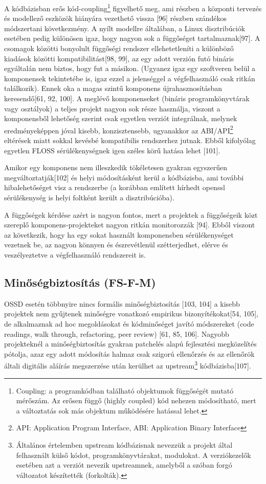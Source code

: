 \documentclass[12pt,magyar,a4paper,oneside]{scrreprt}
\begin{document}
A kódbázisban erős kód-coupling\footnote{Coupling: a programkódban
  található objektumok függőségét mutató mérőszám. Az erősen függő
  (highly coupled) kód nehezen módosítható, mert a változtatás sok más
  objektum működésére hatással lehet.} figyelhető meg, ami részben a
központi tervezés és modellező eszközök hiányára vezethető vissza
{[}96{]} részben szándékos módszertani következmény. A nyílt modellre
általában, a Linux disztribúciók esetében pedig különösen igaz, hogy
nagyon sok a függőséget tartalmaznak{[}97{]}. A csomagok közötti
bonyolult függőségi rendszer ellehetetleníti a különböző kiadások
közötti kompatibilitást{[}98, 99{]}, az egy adott verzión futó bináris
egyáltalán nem biztos, hogy fut a másikon. (Ugyanez igaz egy szoftveren
belül a komponensek tekintetébe is, igaz ezzel a jelenséggel a
végfelhasználó csak ritkán találkozik). Ennek oka a magas szintű
komponens újrahasznosításban keresendő{[}61, 92, 100{]}. A meglévő
komponenseket (bináris programkönyvtárak vagy osztályok) a teljes
projekt nagyon sok része használja, viszont a komponensből lehetőség
szerint csak egyetlen verziót integrálnak, melynek eredményeképpen jóval
kisebb, konzisztensebb, ugyanakkor az ABI/API\footnote{API: Application
  Program Interface, ABI: Application Binary Interface} eltérések miatt
sokkal kevésbé kompatibilis rendszerhez jutnak. Ebből kifolyólag
egyetlen FLOSS sérülékenységnek igen széles körű hatása lehet {[}101{]}.

Amikor egy komponens nem illeszkedik tökéletesen gyakran egyszerűen
megváltoztatják{[}102{]} és helyi módosításként kerül a kódbázisba, ami
további hibalehetőséget visz a rendszerbe (a korábban említett hírhedt
openssl sérülékenység is helyi foltként került a disztribúcióba).

A függőségek kérdése azért is nagyon fontos, mert a projektek a
függőségeik közt szereplő komponens-projekteket nagyon ritkán
monitorozzák {[}94{]}. Ebből viszont az következik, hogy ha egy sokat
használt komponensben sérülékenységet vezetnek be, az nagyon könnyen és
észrevétlenül szétterjedhet, elérve és veszélyeztetve a végfelhasználó
rendszereit is.

\hypertarget{sec:FS-F-M}{%
\subsection{Minőségbiztosítás (FS-F-M)}\label{sec:FS-F-M}}

OSSD esetén többnyire nincs formális minőségbiztosítás {[}103, 104{]} a
kisebb projektek nem gyűjtenek minőségre vonatkozó empirikus
bizonyítékokat{[}54, 105{]}, de alkalmaznak ad hoc megoldásokat és
kódminőséget javító módszereket (code readings, walk through,
refactoring, peer review) {[}61, 85, 106{]}. Nagyobb projekteknél a
minőségbiztosítás gyakran patchelés alapú fejlesztési megközelítés
pótolja, azaz egy adott módosítás halmaz csak szigorú ellenőrzés és az
ellenőrök általi digitális aláírás megszerzése után kerülhet az
upstream\footnote{Általános értelemben upstream kódbázisnak nevezzük a
  projekt által felhasznált külső kódot, programkönyvtárakat, modulokat.
  A verziókezelők esetében azt a verziót nevezik upstreamnek, amelyből a
  szóban forgó változatot készítették (forkolták).} kódbázisba{[}107{]}.
\end{document}
